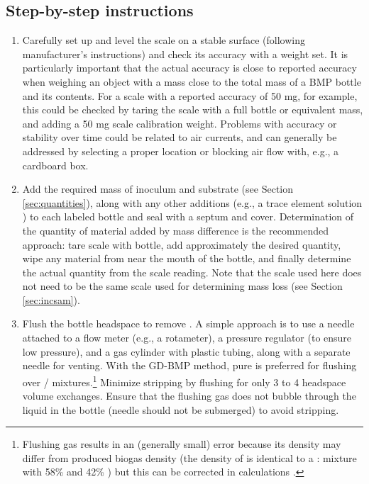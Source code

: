\documentclass[]{article}
\begin{document}
\subsection{Step-by-step instructions}
\begin{enumerate}
  \item Carefully set up and level the scale on a stable surface (following manufacturer's instructions) and check its accuracy with a weight set. 
      It is particularly important that the actual accuracy is close to reported accuracy when weighing an object with a mass close to the total mass of a BMP bottle and its contents. 
      For a scale with a reported accuracy of 50 mg, for example, this could be checked by taring the scale with a full bottle or equivalent mass, and adding a 50 mg scale calibration weight.
      Problems with accuracy or stability over time could be related to air currents, and can generally be addressed by selecting a proper location or blocking air flow with, e.g., a cardboard box.
    \item Add the required mass of inoculum and substrate (see Section \ref{sec:quantities}), along with any other additions (e.g., a trace element solution \citep{holligerStandardizationBiomethanePotential2016}) to each labeled bottle and seal with a septum and cover. 
      Determination of the quantity of material added by mass difference is the recommended approach: tare scale with bottle, add approximately the desired quantity, wipe any material from near the mouth of the bottle, and finally determine the actual quantity from the scale reading. 
      Note that the scale used here does not need to be the same scale used for determining mass loss (see Section \ref{sec:incsam}).
    \item Flush the bottle headspace to remove . 
      A simple approach is to use a needle attached to a flow meter (e.g., a rotameter), a pressure regulator (to ensure low pressure), and a gas cylinder with plastic tubing, along with a separate needle for venting. With the GD-BMP method, pure  is preferred for flushing over / mixtures.\footnote{
        Flushing gas results in an (generally small) error because its density may differ from produced biogas density (the density of  is identical to a : mixture with 58\%  and 42\% ) but this can be corrected in calculations \citep{justesenDevelopmentValidationLowcost2019}.
} 
      Minimize  stripping by flushing for only 3 to 4 headspace volume exchanges. 
      Ensure that the flushing gas does not bubble through the liquid in the bottle (needle should not be submerged) to avoid  stripping. 

\end{enumerate}
\end{document}

